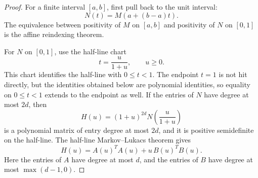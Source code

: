 \documentclass[uplatex,dvipdfmx]{jsarticle}
\theoremstyle{matrixsosdefinition}
\begin{document}
\begin{proof}
For a finite interval \([a,b]\), first pull back to the unit interval:
\[
  N(t)=M(a+(b-a)t).
\]
The equivalence between positivity of \(M\) on \([a,b]\) and positivity of
\(N\) on \([0,1]\) is the affine reindexing theorem.

For \(N\) on \([0,1]\), use the half-line chart
\[
  t=\frac{u}{1+u},\qquad u\ge0.
\]
This chart identifies the half-line with \(0\le t<1\).  The endpoint \(t=1\)
is not hit directly, but the identities obtained below are polynomial
identities, so equality on \(0\le t<1\) extends to the endpoint as well.
If the entries of \(N\) have degree at most \(2d\), then
\[
  H(u)=(1+u)^{2d}N\!\left(\frac{u}{1+u}\right)
\]
is a polynomial matrix of entry degree at most \(2d\), and it is positive
semidefinite on the half-line.  The half-line Markov--Lukacs theorem gives
\[
  H(u)=A(u)^T A(u)+u\,B(u)^T B(u).
\]
Here the entries of \(A\) have degree at most \(d\), and the entries of \(B\)
have degree at most \(\max(d-1,0)\).


\end{proof}
\end{document}
